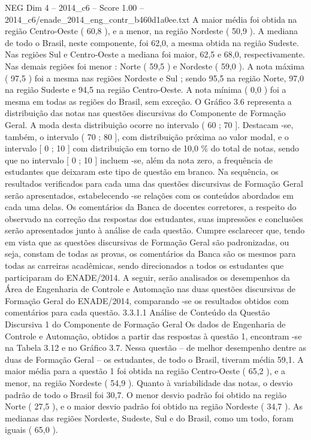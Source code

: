 \begin{textsample}{NEG Dim 4 – 2014\_c6 – Score 1.00 – 2014\_c6/enade\_2014\_eng\_contr\_b460d1a0ee.txt}
A maior média foi obtida na região Centro-Oeste ( 60,8 ), e a menor, na região Nordeste ( 50,9 ).
A mediana de todo o Brasil, neste componente, foi 62,0, a mesma obtida na região Sudeste.
Nas regiões Sul e Centro-Oeste a mediana foi maior, 62,5 e 68,0, respectivamente.
Nas demais regiões foi menor : Norte ( 59,5 ) e Nordeste ( 59,0 ).
A nota máxima ( 97,5 ) foi a mesma nas regiões Nordeste e Sul ; sendo 95,5 na região Norte, 97,0 na região Sudeste e 94,5 na região Centro-Oeste.
A nota mínima ( 0,0 ) foi a mesma em todas as regiões do Brasil, sem exceção.
O Gráfico 3.6 representa a distribuição das notas nas questões discursivas do Componente de Formação Geral.
A moda desta distribuição ocorre no intervalo ( 60 ; 70 ].
Destacam -se, também, o intervalo ( 70 ; 80 ], com distribuição próxima ao valor modal, e o intervalo [ 0 ; 10 ] com distribuição em torno de 10,0 \% do total de notas, sendo que no intervalo [ 0 ; 10 ] incluem -se, além da nota zero, a frequência de estudantes que deixaram este tipo de questão em branco.
Na sequência, os resultados verificados para cada uma das questões discursivas de Formação Geral serão apresentados, estabelecendo -se relações com os conteúdos abordados em cada uma delas.
Os comentários da Banca de docentes corretores, a respeito do observado na correção das respostas dos estudantes, suas impressões e conclusões serão apresentados junto à análise de cada questão.
Cumpre esclarecer que, tendo em vista que as questões discursivas de Formação Geral são padronizadas, ou seja, constam de todas as provas, os comentários da Banca são os mesmos para todas as carreiras acadêmicas, sendo direcionados a todos os estudantes que participaram do ENADE/2014.
A seguir, serão analisados os desempenhos da Área de Engenharia de Controle e Automação nas duas questões discursivas de Formação Geral do ENADE/2014, comparando -se os resultados obtidos com comentários para cada questão. 3.3.1.1 Análise de Conteúdo da Questão Discursiva 1 do Componente de Formação Geral Os dados de Engenharia de Controle e Automação, obtidos a partir das respostas à questão 1, encontram -se na Tabela 3.12 e no Gráfico 3.7.
Nessa questão – de melhor desempenho dentre as duas de Formação Geral – os estudantes, de todo o Brasil, tiveram média 59,1.
A maior média para a questão 1 foi obtida na região Centro-Oeste ( 65,2 ), e a menor, na região Nordeste ( 54,9 ).
Quanto à variabilidade das notas, o desvio padrão de todo o Brasil foi 30,7.
O menor desvio padrão foi obtido na região Norte ( 27,5 ), e o maior desvio padrão foi obtido na região Nordeste ( 34,7 ).
As medianas das regiões Nordeste, Sudeste, Sul e do Brasil, como um todo, foram iguais ( 65,0 ).

\end{textsample}
